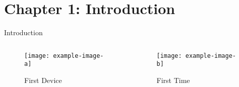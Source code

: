 \documentclass[10pt]{beamer}
\begin{document}
\section{Chapter 1: Introduction}

\begin{frame}{Introduction}
\begin{columns}
        \begin{column}{.45\textwidth}
         \begin{figure}
             \caption*{First Device\footnotemark[1] }
             \texttt{[image: example-image-a]}
         \end{figure}
     \end{column}
     \begin{column}{.45\textwidth}
         \begin{figure}
             \caption*{First Time\footnotemark[2]}
             \texttt{[image: example-image-b]}
         \end{figure}
 \end{column}
\end{columns}
\end{frame}
\end{document}
